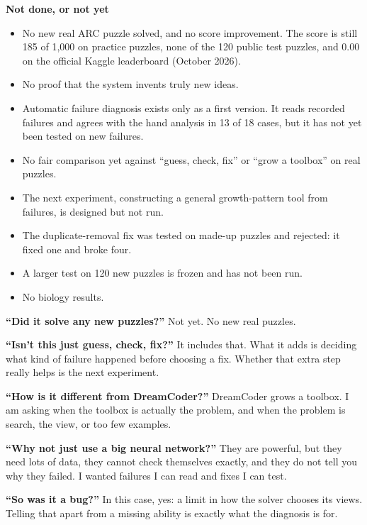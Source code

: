 \documentclass[11pt]{article}
\newcommand{\bigpart}[1]{\par\vspace{1.2em}{\Large\bfseries #1}\par\vspace{0.1em}}
\begin{document}
\textbf{Not done, or not yet}
\begin{itemize}
  \item No new real ARC puzzle solved, and no score improvement. The score is still 185 of 1,000 on
    practice puzzles, none of the 120 public test puzzles, and 0.00 on the official Kaggle
    leaderboard (October 2026).
  \item No proof that the system invents truly new ideas.
  \item Automatic failure diagnosis exists only as a first version. It reads recorded failures and agrees
    with the hand analysis in 13 of 18 cases, but it has not yet been tested on new failures.
  \item No fair comparison yet against ``guess, check, fix'' or ``grow a toolbox'' on real puzzles.
  \item The next experiment, constructing a general growth-pattern tool from failures, is designed but not
    run.
  \item The duplicate-removal fix was tested on made-up puzzles and rejected: it fixed one and broke
    four.
  \item A larger test on 120 new puzzles is frozen and has not been run.
  \item No biology results.
\end{itemize}

\bigpart{Part 4. If they ask}

\textbf{``Did it solve any new puzzles?''} Not yet. No new real puzzles.

\textbf{``Isn't this just guess, check, fix?''} It includes that. What it adds is deciding what kind of
failure happened before choosing a fix. Whether that extra step really helps is the next experiment.

\textbf{``How is it different from DreamCoder?''} DreamCoder grows a toolbox. I am asking when the toolbox is
actually the problem, and when the problem is search, the view, or too few examples.

\textbf{``Why not just use a big neural network?''} They are powerful, but they need lots of data, they cannot
check themselves exactly, and they do not tell you why they failed. I wanted failures I can read and fixes I
can test.

\textbf{``So was it a bug?''} In this case, yes: a limit in how the solver chooses its views. Telling that
apart from a missing ability is exactly what the diagnosis is for.
\end{document}
